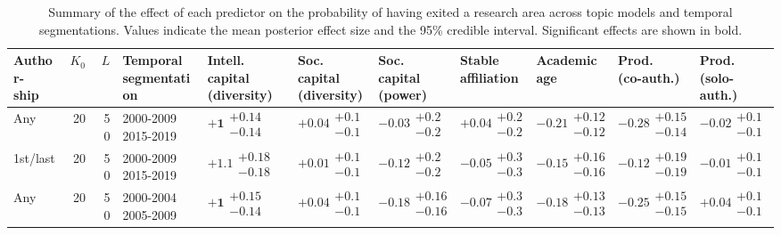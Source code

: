 \begin{table}[H]
\caption{Summary of the effect of each predictor on the probability of having exited a research area across topic models and temporal segmentations. Values indicate the mean posterior effect size and the 95\% credible interval. Significant effects are shown in bold.}
\label{table:full_summary_exited}
\renewcommand{\arraystretch}{2}\fontsize{6}{7}\selectfont\begin{tabular}{lrrllllllll}
\toprule
\makecell{Author-\\ ship} & $K_0$ & $L$ & \makecell{Temporal \\ segmentation} & \makecell{Intell. capital \\ (diversity)} & \makecell{Soc. capital \\ (diversity)} & \makecell{Soc. capital \\ (power)} & \makecell{Stable \\ affiliation} & \makecell{Academic \\ age} & \makecell{Prod. \\ (co-auth.)} & \makecell{Prod. \\ (solo-auth.)} \\
\midrule
Any & 20 & 50 & \makecell{2000-2009 \\ 2015-2019} & $\bm{+1}\substack{+0.14 \\ -0.14}$ & $+0.04\substack{+0.1 \\ -0.1}$ & $-0.03\substack{+0.2 \\ -0.2}$ & $+0.04\substack{+0.2 \\ -0.2}$ & $\bm{-0.21}\substack{+0.12 \\ -0.12}$ & $\bm{-0.28}\substack{+0.15 \\ -0.14}$ & $-0.02\substack{+0.1 \\ -0.1}$ \\
1st/last & 20 & 50 & \makecell{2000-2009 \\ 2015-2019} & $\bm{+1.1}\substack{+0.18 \\ -0.18}$ & $+0.01\substack{+0.1 \\ -0.1}$ & $-0.12\substack{+0.2 \\ -0.2}$ & $-0.05\substack{+0.3 \\ -0.3}$ & $-0.15\substack{+0.16 \\ -0.16}$ & $-0.12\substack{+0.19 \\ -0.19}$ & $-0.01\substack{+0.1 \\ -0.1}$ \\
Any & 20 & 50 & \makecell{2000-2004 \\ 2005-2009} & $\bm{+1}\substack{+0.15 \\ -0.14}$ & $+0.04\substack{+0.1 \\ -0.1}$ & $\bm{-0.18}\substack{+0.16 \\ -0.16}$ & $-0.07\substack{+0.3 \\ -0.3}$ & $\bm{-0.18}\substack{+0.13 \\ -0.13}$ & $\bm{-0.25}\substack{+0.15 \\ -0.15}$ & $+0.04\substack{+0.1 \\ -0.1}$ \\

\end{tabular}
\end{table}
